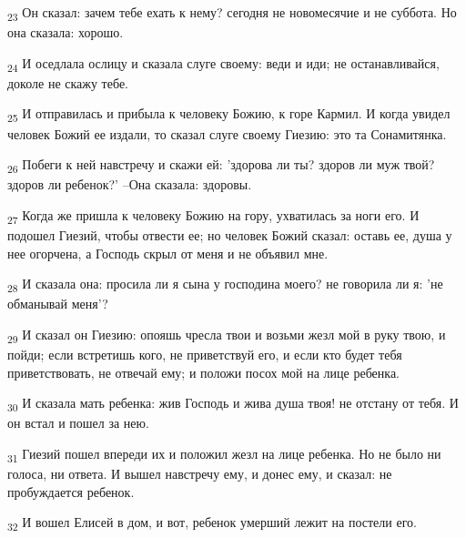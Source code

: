 \begin{tcolorbox}
\textsubscript{23} Он сказал: зачем тебе ехать к нему? сегодня не новомесячие и не суббота. Но она сказала: хорошо.
\end{tcolorbox}
\begin{tcolorbox}
\textsubscript{24} И оседлала ослицу и сказала слуге своему: веди и иди; не останавливайся, доколе не скажу тебе.
\end{tcolorbox}
\begin{tcolorbox}
\textsubscript{25} И отправилась и прибыла к человеку Божию, к горе Кармил. И когда увидел человек Божий ее издали, то сказал слуге своему Гиезию: это та Сонамитянка.
\end{tcolorbox}
\begin{tcolorbox}
\textsubscript{26} Побеги к ней навстречу и скажи ей: 'здорова ли ты? здоров ли муж твой? здоров ли ребенок?' --Она сказала: здоровы.
\end{tcolorbox}
\begin{tcolorbox}
\textsubscript{27} Когда же пришла к человеку Божию на гору, ухватилась за ноги его. И подошел Гиезий, чтобы отвести ее; но человек Божий сказал: оставь ее, душа у нее огорчена, а Господь скрыл от меня и не объявил мне.
\end{tcolorbox}
\begin{tcolorbox}
\textsubscript{28} И сказала она: просила ли я сына у господина моего? не говорила ли я: 'не обманывай меня'?
\end{tcolorbox}
\begin{tcolorbox}
\textsubscript{29} И сказал он Гиезию: опояшь чресла твои и возьми жезл мой в руку твою, и пойди; если встретишь кого, не приветствуй его, и если кто будет тебя приветствовать, не отвечай ему; и положи посох мой на лице ребенка.
\end{tcolorbox}
\begin{tcolorbox}
\textsubscript{30} И сказала мать ребенка: жив Господь и жива душа твоя! не отстану от тебя. И он встал и пошел за нею.
\end{tcolorbox}
\begin{tcolorbox}
\textsubscript{31} Гиезий пошел впереди их и положил жезл на лице ребенка. Но не было ни голоса, ни ответа. И вышел навстречу ему, и донес ему, и сказал: не пробуждается ребенок.
\end{tcolorbox}
\begin{tcolorbox}
\textsubscript{32} И вошел Елисей в дом, и вот, ребенок умерший лежит на постели его.
\end{tcolorbox}
